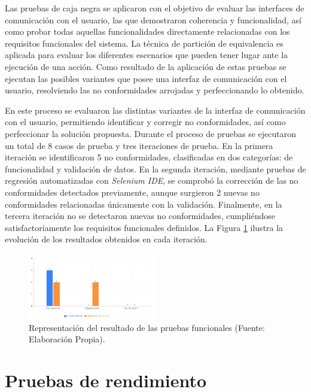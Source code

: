Las pruebas de caja negra se aplicaron con el objetivo de evaluar las interfaces de comunicación con el
usuario, las que demostraron coherencia y funcionalidad, así como probar todas aquellas funcionalidades
directamente relacionadas con los requisitos funcionales del sistema. La técnica de partición de equivalencia
es aplicada para evaluar los diferentes escenarios que pueden tener lugar ante la ejecución de una acción.
Como resultado de la aplicación de estas pruebas se ejecutan las posibles variantes que posee una interfaz
de comunicación con el usuario, resolviendo las no conformidades arrojadas y perfeccionando lo obtenido.

En este proceso se evaluaron las distintas variantes de la interfaz de comunicación con el usuario, permitiendo identificar y corregir no conformidades, así como perfeccionar la solución propuesta. Durante el proceso de pruebas se ejecutaron un total de 8 casos de prueba y tres iteraciones de prueba. En la primera iteración se identificaron 5 no conformidades, clasificadas en dos categorías: de funcionalidad y validación de datos. En la segunda iteración, mediante pruebas de regresión automatizadas con \textit{Selenium IDE}, se comprobó la corrección de las no conformidades detectados previamente, aunque surgieron 2 nuevas no conformidades relacionadas únicamente con la validación. Finalmente, en la tercera iteración no se detectaron nuevas no conformidades, cumpliéndose satisfactoriamente los requisitos funcionales definidos. La Figura \ref{fig:grafica_rf} ilustra la evolución de los resultados obtenidos en cada iteración.
\begin{figure}[htbp] %
	\centering
	\includegraphics[width=0.5\textwidth]{images/grafica_pruebas_funcionales.PNG} 
	\caption{Representación del resultado de las pruebas funcionales (Fuente: Elaboración Propia).}
	\label{fig:grafica_rf}
\end{figure}



\section{Pruebas de rendimiento}

